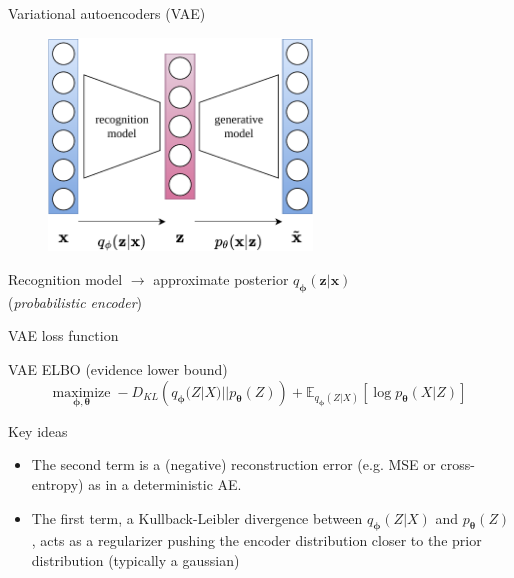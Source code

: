 \documentclass{beamer}
\begin{document}
  \begin{frame}{Variational autoencoders (VAE)}

    \begin{figure}
      \includegraphics[width=7cm]{rc/vae}
    \end{figure}

    Recognition model $\rightarrow$ \alert{approximate posterior} $q_{\boldsymbol{\phi}}(\mathbf{z}|\mathbf{x})$\\
    (\emph{probabilistic encoder})

  \end{frame}

  \begin{frame}{VAE loss function}

    
    \begin{exampleblock}{VAE ELBO (evidence lower bound)}
      \vspace{-0.25cm}
      \begin{equation*}
        \underset{\boldsymbol{\phi},\boldsymbol{\theta}}{\text{maximize}} \; -D_{KL}\left(q_{\boldsymbol{\phi}}(Z|X)||p_{\boldsymbol{\theta}}(Z)\right) + \mathbb{E}_{q_{\boldsymbol{\phi}}(Z|X)}\left[\log p_{\boldsymbol{\theta}}(X|Z)\right]
      \end{equation*}
    \end{exampleblock}

    \begin{alertblock}{Key ideas}
      \begin{itemize}
        \item The second term is a (negative) \alert{reconstruction error} (e.g. MSE or cross-entropy) as in a deterministic AE.
        \item The first term, a Kullback-Leibler divergence between $q_{\boldsymbol{\phi}}(Z|X)$ and $p_{\boldsymbol{\theta}}(Z)$, acts as a \alert{regularizer} pushing the encoder distribution closer to the prior distribution (typically a gaussian)
      \end{itemize}
    \end{alertblock}

  \end{frame}
\end{document}
